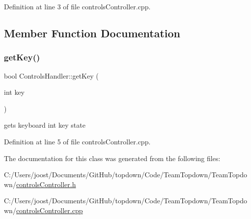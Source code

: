 Definition at line 3 of file controls\+Controller.\+cpp.



\subsection{Member Function Documentation}
\mbox{\label{class_controls_handler_a972e6c177eebdbe46033e39e64152f62}} 
\subsubsection{\texorpdfstring{get\+Key()}{getKey()}}
{\footnotesize\ttfamily bool Controls\+Handler\+::get\+Key (\begin{DoxyParamCaption}\item[{int}]{key }\end{DoxyParamCaption})}

gets keyboard int key state 

Definition at line 5 of file controls\+Controller.\+cpp.



The documentation for this class was generated from the following files\+:\begin{DoxyCompactItemize}
\item 
C\+:/\+Users/joost/\+Documents/\+Git\+Hub/topdown/\+Code/\+Team\+Topdown/\+Team\+Topdown/\hyperlink{controls_controller_8h}{controls\+Controller.\+h}\item 
C\+:/\+Users/joost/\+Documents/\+Git\+Hub/topdown/\+Code/\+Team\+Topdown/\+Team\+Topdown/\hyperlink{controls_controller_8cpp}{controls\+Controller.\+cpp}\end{DoxyCompactItemize}
